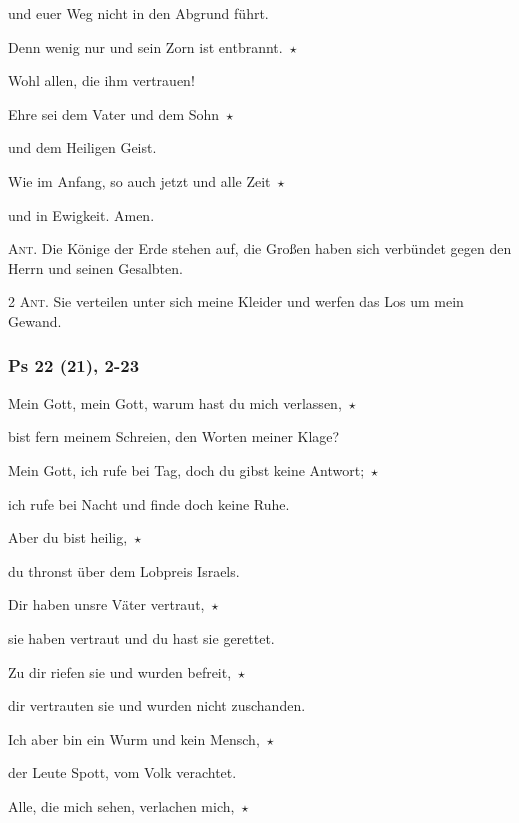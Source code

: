 und euer Weg nicht in den Abgrund führt. 
 
\noindent Denn wenig nur und sein Zorn ist entbrannt.~$\star$~\nopagebreak

Wohl allen, die ihm vertrauen!

\noindent Ehre sei dem Vater und dem Sohn~$\star$~\nopagebreak

und dem Heiligen Geist.

\noindent Wie im Anfang, so auch jetzt und alle Zeit~$\star$~\nopagebreak

und in Ewigkeit. Amen.

\vspace{10pt}

\noindent \textsc{Ant.} Die Könige der Erde stehen auf, die Großen haben sich verbündet gegen den Herrn und seinen Gesalbten.

\vspace{10pt}


\noindent \textsc{2 Ant.} Sie verteilen unter sich meine Kleider und werfen das Los um mein Gewand.

\subsubsection{Ps 22 (21), 2-23}

Mein Gott, mein Gott, warum hast du mich verlassen,~$\star$~\nopagebreak

bist fern meinem Schreien, den Worten meiner Klage?
 
\noindent Mein Gott, ich rufe bei Tag, doch du gibst keine Antwort;~$\star$~\nopagebreak

ich rufe bei Nacht und finde doch keine Ruhe.
 
\noindent Aber du bist heilig,~$\star$~\nopagebreak

du thronst über dem Lobpreis Israels.
 
\noindent Dir haben unsre Väter vertraut,~$\star$~\nopagebreak

sie haben vertraut und du hast sie gerettet.
 
\noindent Zu dir riefen sie und wurden befreit,~$\star$~\nopagebreak

dir vertrauten sie und wurden nicht zuschanden.
 
\noindent Ich aber bin ein Wurm und kein Mensch,~$\star$~\nopagebreak

der Leute Spott, vom Volk verachtet.
 
\noindent Alle, die mich sehen, verlachen mich,~$\star$~\nopagebreak

